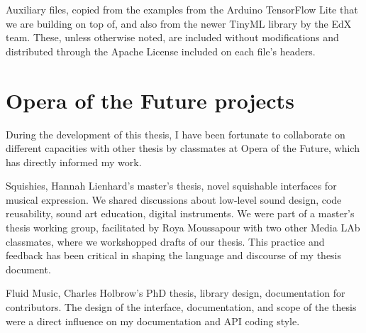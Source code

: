 Auxiliary files, copied from the examples from the Arduino TensorFlow Lite that we are building on top of, and also from the newer TinyML library by the EdX team. These, unless otherwise noted, are included without modifications and distributed through the Apache License included on each file's headers.

\section{Opera of the Future projects}

During the development of this thesis, I have been fortunate to collaborate on different capacities with other thesis by classmates at Opera of the Future, which has directly informed my work.

Squishies, Hannah Lienhard's master's thesis, novel squishable interfaces for musical expression. We shared discussions about low-level sound design, code reusability, sound art education, digital instruments. We were part of a master's thesis working group, facilitated by Roya Moussapour with two other Media LAb classmates, where we workshopped drafts of our thesis. This practice and feedback has been critical in shaping the language and discourse of my thesis document.

Fluid Music, Charles Holbrow's PhD thesis, library design, documentation for contributors. The design of the interface, documentation, and scope of the thesis were a direct influence on my documentation and API coding style.
